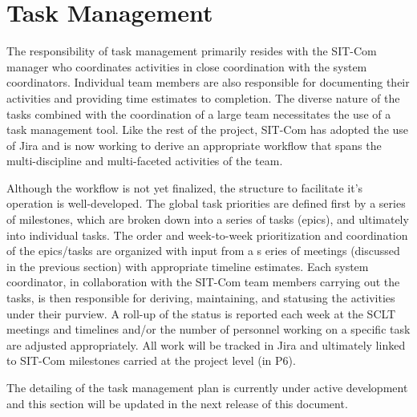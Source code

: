 \documentclass[SE,lsstdraft,authoryear,toc]{lsstdoc}
\begin{document}
\section{Task Management}
\label{sec:task_management}

The responsibility of task management primarily resides with the SIT-Com manager who coordinates activities in close coordination with the system coordinators.
Individual team members are also responsible for documenting their activities and providing time estimates to completion.
The diverse nature of the tasks combined with the coordination of a large team necessitates the use of a task management tool.
Like the rest of the project, SIT-Com has adopted the use of Jira and is now working to derive an appropriate workflow that spans the multi-discipline and multi-faceted activities of the team.

Although the workflow is not yet finalized, the structure to facilitate it's operation is well-developed.
The global task priorities are defined first by a series of milestones, which are broken down into a series of tasks (epics), and ultimately into individual tasks.
The order and week-to-week prioritization and coordination of the epics/tasks are organized with input from a s eries of meetings (discussed in the previous section) with appropriate timeline estimates.
Each system coordinator, in collaboration with the SIT-Com team members carrying out the tasks, is then responsible for deriving, maintaining, and statusing the activities under their purview.
A roll-up of the status is reported each week at the SCLT meetings and timelines and/or the number of personnel working on a specific task are adjusted appropriately.
All work will be tracked in Jira and ultimately linked to SIT-Com milestones carried at the project level (in P6).

The detailing of the task management plan is currently under active development and this section will be updated in the next release of this document.
\end{document}
